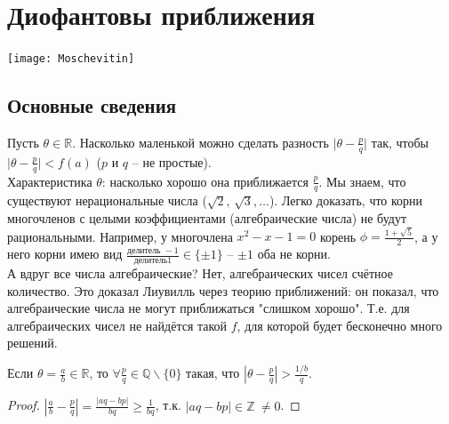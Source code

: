 \newpage

\section{Диофантовы приближения}
\texttt{[image: Moschevitin]}~\\

\subsection{Основные сведения}
	Пусть $\theta \in \mathbb{R}$. Насколько маленькой можно сделать разность $\lvert \theta - \frac{p}{q} \rvert$ так, чтобы $\lvert \theta - \frac{p}{q} \rvert < f(a)$ ($p$ и $q$ -- не простые).\\
	Характеристика $\theta$: насколько хорошо она приближается $\frac{p}{q}$. Мы знаем, что существуют нерациональные числа ($\sqrt{2}, \, \sqrt{3},\dots$). Легко доказать, что корни многочленов с целыми коэффициентами (алгебраические числа) не будут рациональными. Например, у многочлена $x^2 - x -1 =0$ корень $\phi = \frac{1+\sqrt{5}}{2}$, а у него корни имею вид $\frac{\text{делитель } -1}{\text{делитель} 1} \in \{ \pm 1 \}$ -- $\pm 1$ оба не корни.\\
	А вдруг все числа алгебраические? Нет, алгебраических чисел счётное количество. Это доказал Лиувилль через теорию приближений: он показал, что алгебраические числа не могут приближаться "слишком хорошо". Т.е. для алгебраических чисел не найдётся такой $f$, для которой будет бесконечно много решений.\\

\begin{statement}
	Если $\displaystyle \theta = \frac{a}{b} \in \mathbb{R}$, то $\displaystyle \forall \frac{p}{q} \in \mathbb{Q} \backslash \{ 0 \}$ такая, что 
	$\displaystyle \left| \theta - \frac{p}{q} \right| > \frac{1/b}{q}$.
\end{statement}
\begin{proof}
	$\displaystyle \left| \frac{a}{b} - \frac{p}{q} \right| = \frac{|aq - bp|}{bq} \geq \frac{1}{bq}$, т.к. $|aq-bp| \in \mathbb{Z} \ \ne 0$.
\end{proof}

